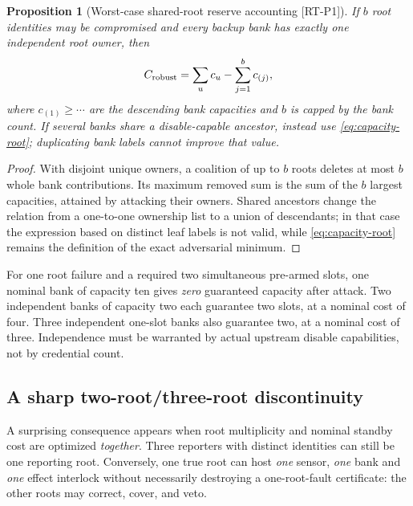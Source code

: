 \documentclass[11pt,a4paper]{article}
\newtheorem{proposition}[theorem]{Proposition}
\theoremstyle{definition}\newtheorem{definition}{Definition}
\newcommand{\idtag}[1]{\textnormal{\textsf{[#1]}}}
\begin{document}
\begin{proposition}[Worst-case shared-root reserve accounting \idtag{RT-P1}]
\label{prop:capacity-root}
If $b$ root identities may be compromised and every backup bank has exactly one independent root owner, then
\begin{equation}\label{eq:largest-loss}
C_{\rm robust}=\sum_{u}c_u-\sum_{j=1}^{b}c_{(j)},
\end{equation}
where $c_{(1)}\ge\cdots$ are the descending bank capacities and $b$ is capped by the bank count. If several banks share a disable-capable ancestor, instead use \cref{eq:capacity-root}; duplicating bank labels cannot improve that value.
\end{proposition}
\begin{proof}
With disjoint unique owners, a coalition of up to $b$ roots deletes at most $b$ whole bank contributions. Its maximum removed sum is the sum of the $b$ largest capacities, attained by attacking their owners. Shared ancestors change the relation from a one-to-one ownership list to a union of descendants; in that case the expression based on distinct leaf labels is not valid, while \cref{eq:capacity-root} remains the definition of the exact adversarial minimum.
\end{proof}
For one root failure and a required two simultaneous pre-armed slots, one nominal bank of capacity ten gives \emph{zero} guaranteed capacity after attack. Two independent banks of capacity two each guarantee two slots, at a nominal cost of four. Three independent one-slot banks also guarantee two, at a nominal cost of three. Independence must be warranted by actual upstream disable capabilities, not by credential count.

\subsection{A sharp two-root/three-root discontinuity}
\label{sec:pareto}
A surprising consequence appears when root multiplicity and nominal standby cost are optimized \emph{together}. Three reporters with distinct identities can still be one reporting root. Conversely, one true root can host \emph{one} sensor, \emph{one} bank and \emph{one} effect interlock without necessarily destroying a one-root-fault certificate: the other roots may correct, cover, and veto.
\end{document}
